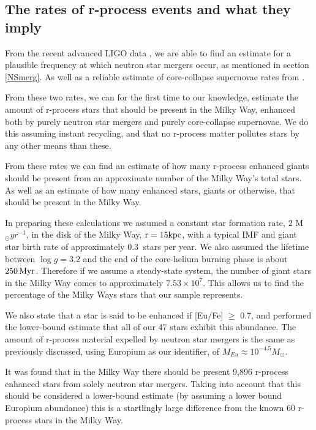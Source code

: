 \documentclass[a4paper,fleqn,usenatbib]{mnras}
\begin{document}
	\subsection{The rates of r-process events and what they imply}
	\label{rates}
	From the recent advanced LIGO data \citep{LIGO2016}, we are able to find an estimate for a plausible frequency at which neutron star mergers occur, as mentioned in section \ref{NSmerg}. As well as a reliable estimate of core-collapse supernovae rates from \citet{Li2011}.
	
	From these two rates, we can for the first time to our knowledge, estimate the amount of r-process stars that should be present in the Milky Way, enhanced both by purely neutron star mergers and purely core-collapse supernovae. We do this assuming instant recycling, and that no r-process matter pollutes stars by any other means than these.
	
	From these rates we can find an estimate of how many r-process enhanced giants should be present from an approximate number of the Milky Way's total stars. As well as an estimate of how many enhanced stars, giants or otherwise, that should be present in the Milky Way.
	
	In preparing these calculations we assumed a constant star formation rate, 2 M$_\odot yr^{-1}$, in the disk of the Milky Way, $\rm{r=15kpc}$, with a typical IMF and giant star birth rate of approximately $0.3\ $ stars per year. We also assumed the lifetime between $\log{g} = 3.2$ and the end of the core-helium burning phase is about $250\,{\rm Myr}$. Therefore if we assume a steady-state system, the number of giant stars in the Milky Way comes to approximately $7.53\times10^7$. This allows us to find the percentage of the Milky Ways stars that our sample represents.
	
	We also state that a star is said to be enhanced if [Eu/Fe] $\geq$ 0.7, and performed the lower-bound estimate that all of our 47 stars exhibit this abundance. The amount of r-process material expelled by neutron star mergers is the same as previously discussed, using Europium as our identifier, of $M_{Eu}\approx10^{-4.5} M_{\odot}$.
	
    It was found that in the Milky Way there should be present 9,896 r-process enhanced stars from solely neutron star mergers. Taking into account that this should be considered a lower-bound estimate (by assuming a lower bound Europium abundance) this is a startlingly large difference from the known 60 r-process stars in the Milky Way.
    
\end{document}
